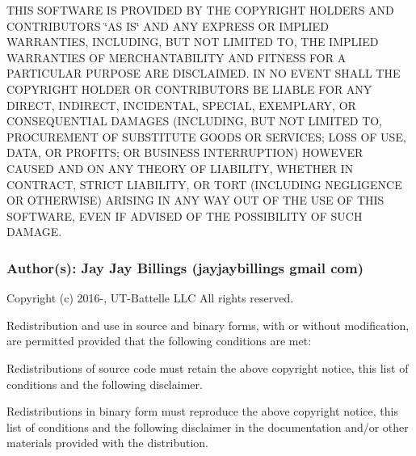 T\+H\+IS S\+O\+F\+T\+W\+A\+RE IS P\+R\+O\+V\+I\+D\+ED BY T\+HE C\+O\+P\+Y\+R\+I\+G\+HT H\+O\+L\+D\+E\+RS A\+ND C\+O\+N\+T\+R\+I\+B\+U\+T\+O\+RS \char`\"{}\+A\+S I\+S\char`\"{} A\+ND A\+NY E\+X\+P\+R\+E\+SS OR I\+M\+P\+L\+I\+ED W\+A\+R\+R\+A\+N\+T\+I\+ES, I\+N\+C\+L\+U\+D\+I\+NG, B\+UT N\+OT L\+I\+M\+I\+T\+ED TO, T\+HE I\+M\+P\+L\+I\+ED W\+A\+R\+R\+A\+N\+T\+I\+ES OF M\+E\+R\+C\+H\+A\+N\+T\+A\+B\+I\+L\+I\+TY A\+ND F\+I\+T\+N\+E\+SS F\+OR A P\+A\+R\+T\+I\+C\+U\+L\+AR P\+U\+R\+P\+O\+SE A\+RE D\+I\+S\+C\+L\+A\+I\+M\+ED. IN NO E\+V\+E\+NT S\+H\+A\+LL T\+HE C\+O\+P\+Y\+R\+I\+G\+HT H\+O\+L\+D\+ER OR C\+O\+N\+T\+R\+I\+B\+U\+T\+O\+RS BE L\+I\+A\+B\+LE F\+OR A\+NY D\+I\+R\+E\+CT, I\+N\+D\+I\+R\+E\+CT, I\+N\+C\+I\+D\+E\+N\+T\+AL, S\+P\+E\+C\+I\+AL, E\+X\+E\+M\+P\+L\+A\+RY, OR C\+O\+N\+S\+E\+Q\+U\+E\+N\+T\+I\+AL D\+A\+M\+A\+G\+ES (I\+N\+C\+L\+U\+D\+I\+NG, B\+UT N\+OT L\+I\+M\+I\+T\+ED TO, P\+R\+O\+C\+U\+R\+E\+M\+E\+NT OF S\+U\+B\+S\+T\+I\+T\+U\+TE G\+O\+O\+DS OR S\+E\+R\+V\+I\+C\+ES; L\+O\+SS OF U\+SE, D\+A\+TA, OR P\+R\+O\+F\+I\+TS; OR B\+U\+S\+I\+N\+E\+SS I\+N\+T\+E\+R\+R\+U\+P\+T\+I\+ON) H\+O\+W\+E\+V\+ER C\+A\+U\+S\+ED A\+ND ON A\+NY T\+H\+E\+O\+RY OF L\+I\+A\+B\+I\+L\+I\+TY, W\+H\+E\+T\+H\+ER IN C\+O\+N\+T\+R\+A\+CT, S\+T\+R\+I\+CT L\+I\+A\+B\+I\+L\+I\+TY, OR T\+O\+RT (I\+N\+C\+L\+U\+D\+I\+NG N\+E\+G\+L\+I\+G\+E\+N\+CE OR O\+T\+H\+E\+R\+W\+I\+SE) A\+R\+I\+S\+I\+NG IN A\+NY W\+AY O\+UT OF T\+HE U\+SE OF T\+H\+IS S\+O\+F\+T\+W\+A\+RE, E\+V\+EN IF A\+D\+V\+I\+S\+ED OF T\+HE P\+O\+S\+S\+I\+B\+I\+L\+I\+TY OF S\+U\+CH D\+A\+M\+A\+GE.

\subsubsection*{Author(s)\+: Jay Jay Billings (jayjaybillings  gmail  com) }



 Copyright (c) 2016-\/, U\+T-\/\+Battelle L\+LC All rights reserved.

Redistribution and use in source and binary forms, with or without modification, are permitted provided that the following conditions are met\+:

Redistributions of source code must retain the above copyright notice, this list of conditions and the following disclaimer.

Redistributions in binary form must reproduce the above copyright notice, this list of conditions and the following disclaimer in the documentation and/or other materials provided with the distribution.

